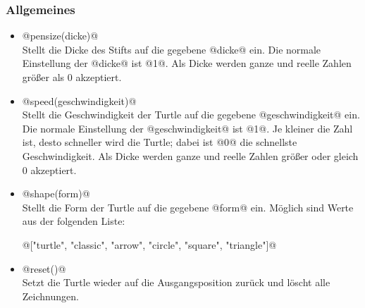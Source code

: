     \subsubsection*{Allgemeines}
    \begin{itemize}
        \item 
        @pensize(dicke)@\\
        Stellt die Dicke des Stifts auf die gegebene @dicke@ ein. Die normale Einstellung der @dicke@ ist @1@. Als Dicke werden ganze und reelle Zahlen größer als 0 akzeptiert.

        \item 
        @speed(geschwindigkeit)@\\
        Stellt die Geschwindigkeit der Turtle auf die gegebene @geschwindigkeit@ ein. Die normale Einstellung der @geschwindigkeit@ ist @1@. 
        Je kleiner die Zahl ist, desto schneller wird die Turtle; dabei ist @0@ die schnellste Geschwindigkeit.
        Als Dicke werden ganze und reelle Zahlen größer oder gleich 0 akzeptiert.

        \item 
        @shape(form)@\\
        Stellt die Form der Turtle auf die gegebene @form@ ein. Möglich sind Werte aus der folgenden Liste:
        \begin{center}
            @["turtle", "classic", "arrow", "circle", "square", "triangle"]@
        \end{center}

        \item 
        @reset()@\\
        Setzt die Turtle wieder auf die Ausgangsposition zurück und löscht alle Zeichnungen.
    \end{itemize}
    
 